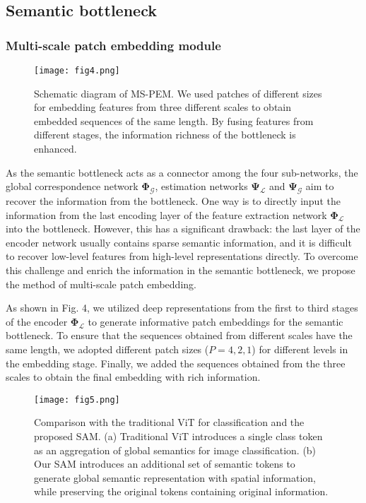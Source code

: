 \documentclass[lettersize,journal]{IEEEtran}
\begin{document}
\subsection{Semantic bottleneck}
\subsubsection{Multi-scale patch embedding module}

 \begin{figure}[t]\centering
\texttt{[image: fig4.png]}
\caption{Schematic diagram of MS-PEM. We used patches of different sizes for embedding features from three different scales to obtain embedded sequences of the same length. By fusing features from different stages, the information richness of the bottleneck is enhanced.}
\label{FIG0}
\end{figure}

As the semantic bottleneck acts as a connector among the four sub-networks, the global correspondence network $\mathbf{\Phi_{\mathcal{G}}}$, estimation networks $\mathbf{\Psi_{\mathcal{L}}}$ and $\mathbf{\Psi_{\mathcal{G}}}$ aim to recover the information from the bottleneck. One way is to directly input the information from the last encoding layer of the feature extraction network $\mathbf{\Phi_{\mathcal{L}}}$ into the bottleneck. However, this has a significant drawback: the last layer of the encoder network usually contains sparse semantic information, and it is difficult to recover low-level features from high-level representations directly. To overcome this challenge and enrich the information in the semantic bottleneck, we propose the method of multi-scale patch embedding.

As shown in Fig. 4, we utilized deep representations from the first to third stages of the encoder $\mathbf{\Phi_{\mathcal{L}}}$ to generate informative patch embeddings for the semantic bottleneck. To ensure that the sequences obtained from different scales have the same length, we adopted different patch sizes ($P=4,2,1$) for different levels in the embedding stage. Finally, we added the sequences obtained from the three scales to obtain the final embedding with rich information.



 \begin{figure}[t]\centering
\texttt{[image: fig5.png]}
\caption{Comparison with the traditional ViT for classification and the proposed SAM. (a) Traditional ViT\cite{r29} introduces a single class token as an aggregation of global semantics for image classification. (b) Our SAM introduces an additional set of semantic tokens to generate global semantic representation with spatial information, while preserving the original tokens containing original information.}
\label{FIG0}
\end{figure}
\end{document}

